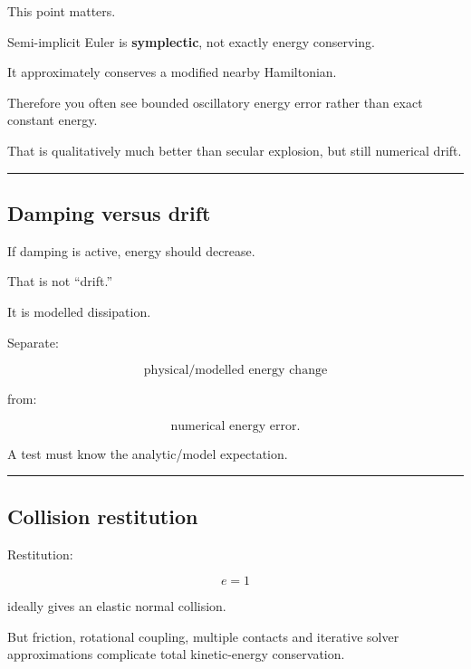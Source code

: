 \hypertarget{06-engine-ii-ch039-semi-implicit-euler-does-not-conserve-the-exact-hamiltonian}{}

This point matters.

Semi-implicit Euler is \textbf{symplectic}, not exactly energy conserving.

It approximately conserves a modified nearby Hamiltonian.

Therefore you often see bounded oscillatory energy error rather than exact constant energy.

That is qualitatively much better than secular explosion, but still numerical drift.

\begin{center}\rule{0.5\linewidth}{0.5pt}\end{center}

\subsection{Damping versus drift}\label{06-engine-ii-ch039-damping-versus-drift}

\hypertarget{06-engine-ii-ch039-damping-versus-drift}{}

If damping is active, energy should decrease.

That is not ``drift.''

It is modelled dissipation.

Separate:

\[
\boxed{
\text{physical/modelled energy change}
}
\]

from:

\[
\boxed{
\text{numerical energy error}.
}
\]

A test must know the analytic/model expectation.

\begin{center}\rule{0.5\linewidth}{0.5pt}\end{center}

\subsection{Collision restitution}\label{06-engine-ii-ch039-collision-restitution}

\hypertarget{06-engine-ii-ch039-collision-restitution}{}

Restitution:

\[
e=1
\]

ideally gives an elastic normal collision.

But friction, rotational coupling, multiple contacts and iterative solver approximations complicate total kinetic-energy conservation.

